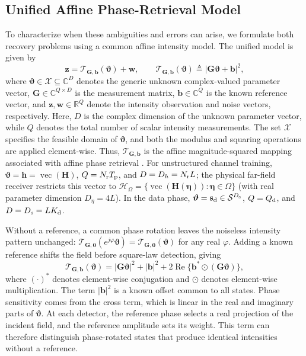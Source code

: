 \documentclass[journal]{IEEEtran}
\begin{document}
\subsection{Unified Affine Phase-Retrieval Model}

To characterize when these ambiguities and errors can arise,
we formulate both recovery problems using a common affine intensity model\cite{affine_phase_retrieval}. The unified model is given by
\begin{equation}
\mathbf z
=
\mathcal T_{\mathbf G,\mathbf b}(\boldsymbol\vartheta)+\mathbf w,
\qquad
\mathcal T_{\mathbf G,\mathbf b}(\boldsymbol\vartheta)
\triangleq
\left|\mathbf G\boldsymbol\vartheta+\mathbf b\right|^2 ,
\label{eq:unified_pr_model}
\end{equation}
where $\boldsymbol\vartheta\in\mathcal X\subseteq\mathbb C^D$ denotes the generic unknown complex-valued parameter vector, 
$\mathbf G\in\mathbb C^{Q\times D}$ is the measurement matrix, 
$\mathbf b\in\mathbb C^Q$ is the known reference vector, 
and $\mathbf z,\mathbf w\in\mathbb R^Q$ denote the intensity observation and noise vectors, respectively. 
Here, $D$ is the complex dimension of the unknown parameter vector, while $Q$ denotes the total number of scalar intensity measurements. 
The set $\mathcal X$ specifies the feasible domain of $\boldsymbol\vartheta$, and both the modulus and squaring operations are applied element-wise. Thus,
$\mathcal T_{\mathbf G,\mathbf b}$ is the affine magnitude-squared mapping
associated with affine phase retrieval \cite{affine_phase_retrieval}. For
unstructured channel training,
$\boldsymbol\vartheta=\mathbf h=\operatorname{vec}(\mathbf H)$,
$Q=N_{\rm r}T_{\rm p}$, and $D=D_h=N_{\rm r}L$; the physical far-field receiver
restricts this vector to
$\mathcal H_\Omega=\{\operatorname{vec}(\mathbf H(\boldsymbol\eta)):
\boldsymbol\eta\in\Omega\}$ (with real parameter dimension $D_\eta=4L$). In the data phase,
$\boldsymbol\vartheta=\mathbf s_{\rm d}\in\mathcal S^{D_{\rm s}}$,
$Q=Q_{\rm d}$, and $D=D_{\rm s}=LK_{\rm d}$.

Without a reference, a common phase rotation leaves the noiseless
intensity pattern unchanged:
$\mathcal T_{\mathbf G,\mathbf 0}(e^{j\varphi}\boldsymbol\vartheta)
=\mathcal T_{\mathbf G,\mathbf 0}(\boldsymbol\vartheta)$ for any real
$\varphi$. Adding a known reference shifts the field before
square-law detection, giving
\begin{equation}
\mathcal T_{\mathbf G,\mathbf b}(\boldsymbol\vartheta)
=
|\mathbf G\boldsymbol\vartheta|^2+|\mathbf b|^2
+2\operatorname{Re}\{\mathbf b^*\odot(\mathbf G\boldsymbol\vartheta)\},
\label{eq:reference_expansion}
\end{equation}
where $(\cdot)^*$ denotes element-wise conjugation and $\odot$ denotes
element-wise multiplication. The term $|\mathbf b|^2$ is a known
offset common to all states. Phase sensitivity comes from the
cross term, which is linear in the real and imaginary parts of
$\boldsymbol\vartheta$. At each detector, the reference phase selects
a real projection of the incident field, and the reference
amplitude sets its weight. This term can therefore distinguish
phase-rotated states that produce identical intensities without
a reference.
\end{document}
